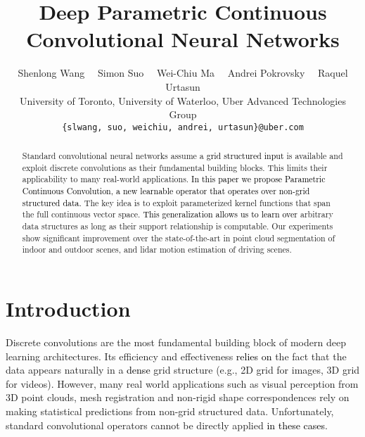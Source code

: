 \documentclass[10pt,twocolumn,letterpaper]{article}
\newcommand\simon[1]{\textcolor{black}{#1}}
\begin{document}
\title{Deep Parametric Continuous Convolutional Neural Networks}

\author{ Shenlong Wang  \ \ Simon Suo  \ \ Wei-Chiu Ma  \ \ Andrei Pokrovsky \ \ Raquel Urtasun \\
University of Toronto, University of Waterloo, Uber Advanced Technologies Group\\
{\tt\small \{slwang, suo, weichiu, andrei, urtasun\}@uber.com}
}

\maketitle



\begin{abstract}

Standard convolutional neural networks assume a \simon{grid structured input} is available and exploit discrete convolutions as their fundamental building blocks. This limits their applicability to many real-world applications. 
\simon{In this paper we propose Parametric Continuous Convolution, a new learnable operator that operates over non-grid structured data.} The key idea is to exploit parameterized kernel functions that span the full continuous vector space. 
\simon{This generalization allows us to learn over} 
arbitrary data structures as long as their support relationship is computable.
Our experiments show significant improvement over the state-of-the-art in point cloud segmentation of indoor and outdoor scenes, and lidar motion estimation of driving scenes. 


\end{abstract}

  

\section{Introduction}





Discrete convolutions are the most fundamental building block of modern deep learning architectures. 
Its efficiency and effectiveness \simon{relies on} 
the fact that the data appears naturally in a \simon{dense} grid structure (e.g., 2D grid for images,  3D grid for videos). 
However, many real world applications such as visual perception from 3D point clouds,  mesh registration and non-rigid shape correspondences rely on making statistical predictions from non-grid structured data. 
Unfortunately, standard convolutional operators cannot be directly applied \simon{in these cases}. 
\end{document}
